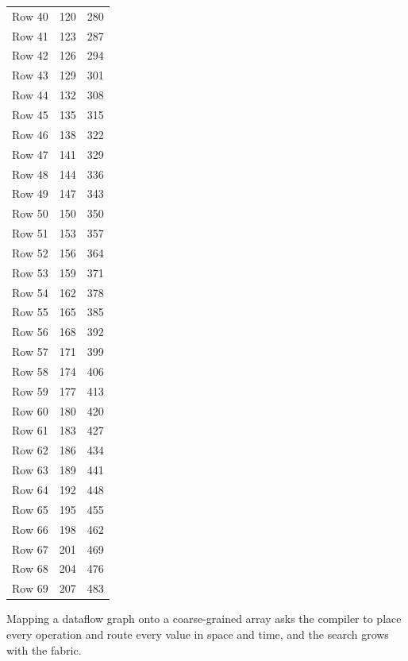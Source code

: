 \documentclass{article}
\begin{document}
\begin{longtable}{lrr}
  Row 40 & 120 & 280 \\
  Row 41 & 123 & 287 \\
  Row 42 & 126 & 294 \\
  Row 43 & 129 & 301 \\
  Row 44 & 132 & 308 \\
  Row 45 & 135 & 315 \\
  Row 46 & 138 & 322 \\
  Row 47 & 141 & 329 \\
  Row 48 & 144 & 336 \\
  Row 49 & 147 & 343 \\
  Row 50 & 150 & 350 \\
  Row 51 & 153 & 357 \\
  Row 52 & 156 & 364 \\
  Row 53 & 159 & 371 \\
  Row 54 & 162 & 378 \\
  Row 55 & 165 & 385 \\
  Row 56 & 168 & 392 \\
  Row 57 & 171 & 399 \\
  Row 58 & 174 & 406 \\
  Row 59 & 177 & 413 \\
  Row 60 & 180 & 420 \\
  Row 61 & 183 & 427 \\
  Row 62 & 186 & 434 \\
  Row 63 & 189 & 441 \\
  Row 64 & 192 & 448 \\
  Row 65 & 195 & 455 \\
  Row 66 & 198 & 462 \\
  Row 67 & 201 & 469 \\
  Row 68 & 204 & 476 \\
  Row 69 & 207 & 483 \\
\bottomrule
\end{longtable}
Mapping a dataflow graph onto a coarse-grained array asks the compiler to place every operation and route every value in space and time, and the search grows with the fabric.
\end{document}
